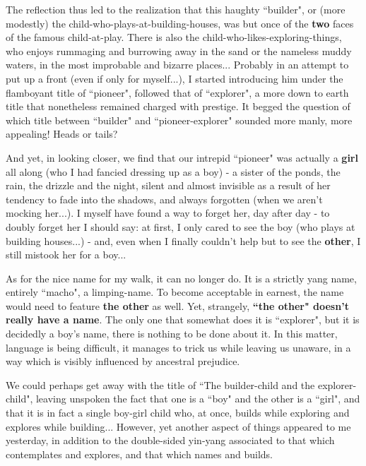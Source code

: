 The reflection thus led to the realization that this haughty ``builder", or (more modestly) the child-who-plays-at-building-houses, was but once of the \textbf{two} faces of the famous child-at-play. There is also the child-who-likes-exploring-things, who enjoys rummaging and burrowing away in the sand or the nameless muddy waters, in the most improbable and bizarre places...  Probably in an attempt to put up a front (even if only for myself...), I started introducing him under the flamboyant title of ``pioneer", followed that of ``explorer",  a more down to earth title that nonetheless remained charged with prestige. It begged the question of which title between ``builder" and ``pioneer-explorer" sounded more manly, more appealing! Heads or tails?

And yet, in looking closer, we find that our intrepid ``pioneer" was actually a \textbf{girl} all along (who I had fancied dressing up as a boy) - a sister of the ponds, the rain, the drizzle and the night, silent and almost invisible as a result of her tendency to fade into the shadows, and always forgotten (when we aren't mocking her...). I myself have found a way to forget her, day after day - to doubly forget her I should say: at first, I only cared to see the boy (who plays at building houses...) - and, even when I finally couldn't help but to see the \textbf{other}, I still mistook her for a boy...

As for the nice name for my walk, it can no longer do. It is a strictly yang name, entirely ``macho", a limping-name. To become acceptable in earnest, the name would need to feature \textbf{the other} as well. Yet, strangely, \textbf{``the other" doesn't really have a name}. The only one that somewhat does it is ``explorer", but it is decidedly a boy's name, there is nothing to be done about it. In this matter, language is being difficult, it manages to trick us while leaving us unaware, in a way which is visibly influenced by ancestral prejudice.

We could perhaps get away with the title of ``The builder-child and the explorer-child", leaving unspoken the fact that one is a ``boy" and the other is a ``girl", and that it is in fact a single boy-girl child who, at once, builds while exploring and explores while building... However, yet another aspect of things appeared to me yesterday, in addition to the double-sided yin-yang associated to that which contemplates and explores, and that which names and builds.

